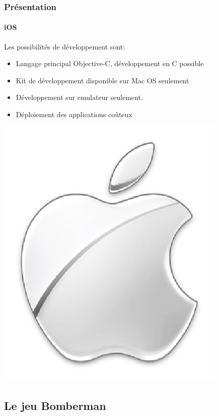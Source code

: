 \begin{frame}
\frametitle{Présentation}
\framesubtitle{iOS}
	\begin{minipage}{8cm}
	Les possibilités de développement sont: \\ 

	\begin{itemize}
		\item Langage principal Objective-C, développement en C possible
		\item Kit de développement disponible sur Mac OS seulement
		\item Développement sur emulateur seulement.
		\item Déploiement des applications coûteux
	\end{itemize}
	\end{minipage}  \includegraphics[scale=0.2]{img/apple.png} 
\end{frame}


 
\subsection{Le jeu Bomberman}



